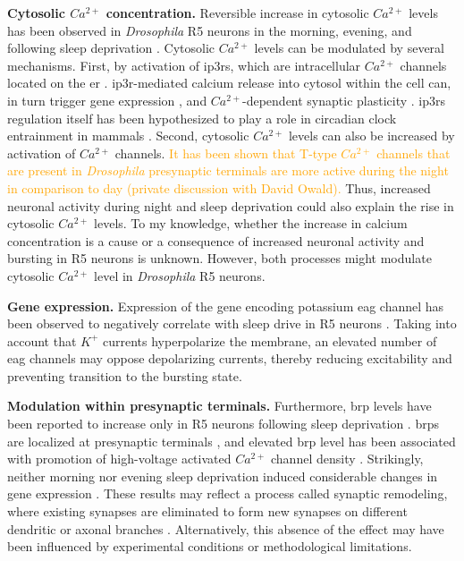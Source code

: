 \documentclass[../main.tex]{subfiles}
\begin{document}
\textbf{Cytosolic $Ca^{2+}$ concentration.}
Reversible increase in cytosolic $Ca^{2+}$ levels has been observed in \textit{Drosophila} R5 neurons in the morning, evening, and following sleep deprivation \cite{andreaniCircadianProgrammingEllipsoid2022,liuSleepDriveEncoded2016}. Cytosolic $Ca^{2+}$ levels can be modulated by several mechanisms. First, by activation of \glspl{ip3r}, which are intracellular $Ca^{2+}$ channels located on the \gls{er} \cite{schmitzStructuralBasisActivation2022}. \gls{ip3r}-mediated calcium release into cytosol within the cell can, in turn trigger gene expression \cite{schmitzStructuralBasisActivation2022}, and $Ca^{2+}$-dependent synaptic plasticity \cite{liuSleepDriveEncoded2016}. \glspl{ip3r} regulation itself has been hypothesized to play a role in circadian clock entrainment in mammals \cite{hamadaRoleInositolTrisphosphateinduced1999}. Second, cytosolic $Ca^{2+}$ levels can also be increased by activation of $Ca^{2+}$ channels. \textcolor{orange}{It has been shown that T-type $Ca^{2+}$ channels that are present in \textit{Drosophila} presynaptic terminals are more active during the night in comparison to day (private discussion with David Owald).}
Thus, increased neuronal activity during night and sleep deprivation could also explain the rise in cytosolic $Ca^{2+}$ levels. To my knowledge, whether the increase in calcium concentration is a cause or a consequence of increased neuronal activity and bursting in R5 neurons is unknown. However, both processes might modulate cytosolic $Ca^{2+}$ level in \textit{Drosophila} R5 neurons.

\textbf{Gene expression.}
Expression of the gene encoding potassium \gls{eag} channel has been observed to negatively correlate with sleep drive in R5 neurons \cite{doppSinglecellTranscriptomicsReveals2024}. Taking into account that $K^{+}$ currents hyperpolarize the membrane, an elevated number of \gls{eag} channels may oppose depolarizing currents, thereby reducing excitability and preventing transition to the bursting state.

\textbf{Modulation within presynaptic terminals.}
Furthermore, \gls{brp} levels have been reported to increase only in R5 neurons following sleep deprivation \cite{liuSleepDriveEncoded2016}. \glspl{brp} are localized at presynaptic terminals \cite{waghBruchpilotProteinHomology2006}, and elevated \gls{brp} level has been associated with promotion of high-voltage activated $Ca^{2+}$ channel density \cite{kittelBruchpilotPromotesActive2006}. Strikingly, neither morning nor evening sleep deprivation induced considerable changes in gene expression \cite{andreaniCircadianProgrammingEllipsoid2022}. These results may reflect a process called synaptic remodeling, where existing synapses are eliminated to form new synapses on different dendritic or axonal branches \cite{kurupNeuralCircuitRewiring2016}. Alternatively, this absence of the effect may have been influenced by experimental conditions or methodological limitations.
\end{document}
